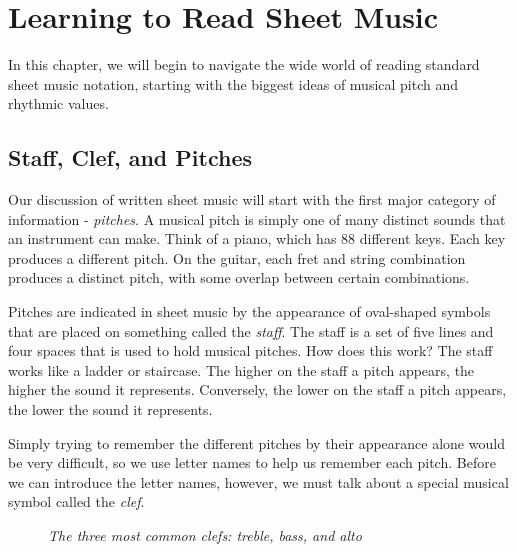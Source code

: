 \chapter{Learning to Read Sheet Music}

In this chapter, we will begin to navigate the wide world of reading standard sheet music notation, starting with the biggest ideas of musical pitch and rhythmic values.

\section{Staff, Clef, and Pitches}

Our discussion of written sheet music will start with the first major category of information - \textit{pitches}. A musical pitch is simply one of many distinct sounds that an instrument can make. Think of a piano, which has 88 different keys. Each key produces a different pitch. On the guitar, each fret and string combination produces a distinct pitch, with some overlap between certain combinations.

Pitches are indicated in sheet music by the appearance of oval-shaped symbols that are placed on something called the \textit{staff}. The staff is a set of five lines and four spaces that is used to hold musical pitches. How does this work? The staff works like a ladder or staircase. The higher on the staff a pitch appears, the higher the sound it represents. Conversely, the lower on the staff a pitch appears, the lower the sound it represents. 


Simply trying to remember the different pitches by their appearance alone would be very difficult, so we use letter names to help us remember each pitch. Before we can introduce the letter names, however, we must talk about a special musical symbol called the \textit{clef}. 

\begin{figure}[h]
	\begin{center}
		\huge
		\clefG \hspace{5mm} \clefF \hspace{5mm} \clefC
	\end{center}
	\caption{\textit{The three most common clefs: treble, bass, and alto}}
\end{figure}

